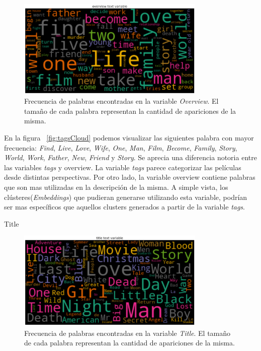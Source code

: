 \documentclass[11pt,a4paper,twoside]{thesis}
\begin{document}
\begin{figure}[h!]
	\centering
	\includegraphics[width=9cm]{./images/Cloud-Overview.png}
	\caption{Frecuencia de palabras encontradas en la variable \textit{Overview}. El tamaño de cada palabra representan la cantidad de apariciones de la misma.}
	\label{fig:overviewCloud}
\end{figure}	


En la figura ~\ref{fig:tagsCloud} podemos visualizar las siguientes palabra con mayor frecuencia: \textit{Find}, \textit{Live}, \textit{Love}, \textit{Wife}, \textit{One}, \textit{Man}, \textit{Film}, \textit{Become}, \textit{Family}, \textit{Story}, \textit{World}, \textit{Work}, \textit{Father}, \textit{New}, \textit{Friend} y \textit{Story}. Se aprecia una diferencia notoria entre las variables \textit{tags} y overview. La variable \textit{tags} parece categorizar las películas desde distintas perspectivas. Por otro lado, la variable overview contiene palabras que son mas utilizadas en la descripción de la misma. A simple vista, los clústeres(\textit{Embeddings}) que pudieran generarse utilizando esta variable, podrían ser mas específicos que aquellos clusters generados a partir de la variable \textit{tags}.


\begin{description}
	\item[Title]
\end{description}

\begin{figure}[h!]
	\centering
	\includegraphics[width=9cm]{./images/Cloud-Title.png}
	\caption{Frecuencia de palabras encontradas en la variable \textit{Title}. El tamaño de cada palabra representan la cantidad de apariciones de la misma.}
	\label{fig:titleCloud}
\end{figure}	
\end{document}
